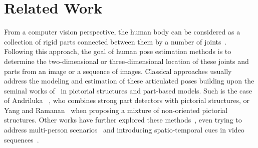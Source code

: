 \chapter{Related Work}\label{ch:related_work}
From a computer vision perspective, the human body can be considered as a collection of rigid parts connected between them by a number of joints~\cite{Gong2016-kd}. Following %
this approach, the goal of human pose estimation methods is to determine the two-dimensional or three-dimensional location of these joints and parts from an image or a sequence of images. Classical approaches usually address the modeling and estimation of these articulated poses building upon the seminal works of~\cite{Fischler1973-bi, Felzenszwalb2010-me} in pictorial structures and part-based models. Such is the case of Andriluka \etal~\cite{Andriluka2009-on}, who combines strong part detectors with pictorial structures, or Yang and Ramanan~\cite{Yang2011-vn} when proposing a mixture of non-oriented pictorial structures. Other works have further explored these methods~\cite{Sapp2010-dm, Pishchulin2013-zi, Kiefel2014-vm, Wang2013-wv}, even trying to address multi-person scenarios~\cite{Eichner2010-ey} and introducing spatio-temporal cues %
in video sequences~\cite{Cherian2014-zf, Fathi2007-dc, Ferrari2008-ry, Zhang2015-js}.

